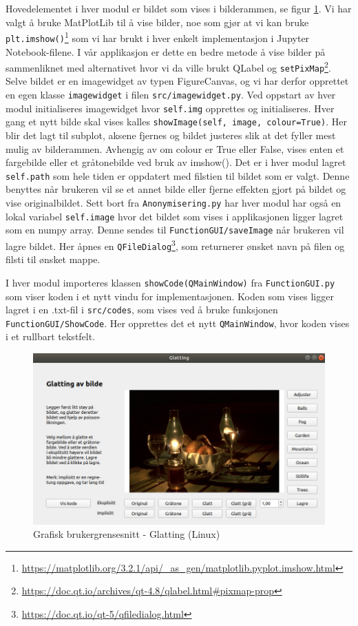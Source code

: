 Hovedelementet i hver modul er bildet som vises i bilderammen, se figur \ref{fig:guiexample}. Vi har valgt å bruke MatPlotLib til å vise bilder, noe som gjør at vi kan bruke \texttt{plt.imshow()}\footnote{\url{https://matplotlib.org/3.2.1/api/_as_gen/matplotlib.pyplot.imshow.html}} som vi har brukt i hver enkelt implementasjon i Jupyter Notebook-filene. I vår applikasjon er dette en bedre metode å vise bilder på sammenliknet med alternativet hvor vi da ville brukt QLabel og \texttt{setPixMap}\footnote{\url{https://doc.qt.io/archives/qt-4.8/qlabel.html\#pixmap-prop}}. Selve bildet er en imagewidget av typen FigureCanvas, og vi har derfor opprettet en egen klasse \texttt {imagewidget} i filen \texttt{src/imagewidget.py}. Ved oppstart av hver modul initialiseres imagewidget hvor \texttt{self.img} opprettes og initialiseres. Hver gang et nytt bilde skal vises kalles \texttt{showImage(self, image, colour=True)}. Her blir det lagt til subplot, aksene fjernes og bildet justeres slik at det fyller mest mulig av bilderammen. Avhengig av om colour er True eller False, vises enten et fargebilde eller et gråtonebilde ved bruk av imshow(). Det er i hver modul lagret \texttt{self.path} som hele tiden er oppdatert med filstien til bildet som er valgt. Denne benyttes når brukeren vil se et annet bilde eller fjerne effekten gjort på bildet og vise originalbildet. Sett bort fra \texttt{Anonymisering.py} har hver modul har også en lokal variabel \texttt{self.image} hvor det bildet som vises i applikasjonen ligger lagret som en numpy array. Denne sendes til \texttt{FunctionGUI/saveImage} når brukeren vil lagre bildet. Her åpnes en \texttt{QFileDialog}\footnote{\url{https://doc.qt.io/qt-5/qfiledialog.html}}, som returnerer ønsket navn på filen og filsti til ønsket mappe.

I hver modul importeres klassen \texttt{showCode(QMainWindow)} fra \texttt{FunctionGUI.py} som viser koden i et nytt vindu for implementasjonen. Koden som vises ligger lagret i en .txt-fil i \texttt{src/codes}, som vises ved å bruke funksjonen \texttt{FunctionGUI/ShowCode}. Her opprettes det et nytt \texttt{QMainWindow}, hvor koden vises i et rullbart tekstfelt. 
\\[1cm]
\begin{figure}[H]
\begin{center}
    \includegraphics[width=0.9\columnwidth]{bilder/Gui/guiexample.jpg}
     \caption{Grafisk brukergrensesnitt - Glatting (Linux) \label{fig:guiexample}}
\end{center}
\end{figure}
\newpage
